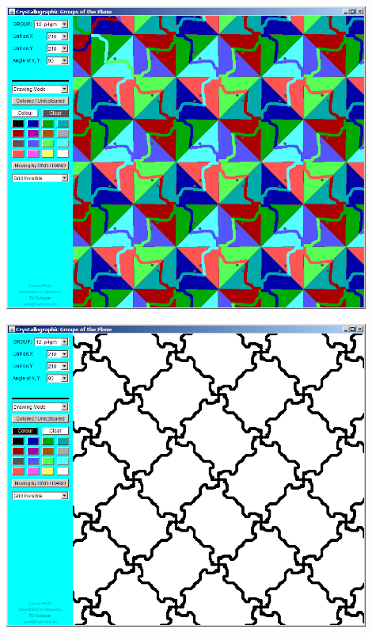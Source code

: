 \begin{frame}
  \includegraphics[width=0.9\textwidth]{illustration5.png}
\end{frame}

\begin{frame}
  \includegraphics[width=0.9\textwidth]{illustration6.png}
\end{frame}

